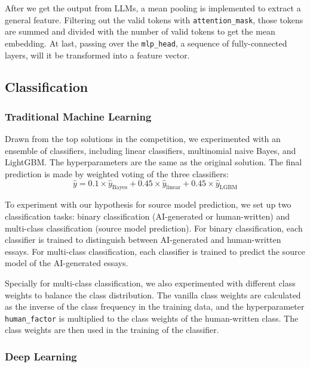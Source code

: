 \documentclass[conference]{IEEEtran}
\begin{document}
After we get the output from LLMs, a mean pooling is implemented to extract a general feature. Filtering out the valid tokens with \texttt{attention\_mask}, those tokens are summed and divided with the number of valid tokens to get the mean embedding. At last, passing over the \texttt{mlp\_head}, a sequence of fully-connected layers, will it be transformed into a feature vector.

\subsection{Classification}

\subsubsection{Traditional Machine Learning}
\label{sec:traditional_ml}

Drawn from the top solutions in the competition, we experimented with an ensemble of classifiers, including linear classifiers, multinomial naive Bayes, and LightGBM. The hyperparameters are the same as the original solution. The final prediction is made by weighted voting of the three classifiers:
\begin{equation}
  \hat{y} = 0.1 \times \hat{y}_{\text{Bayes}} + 0.45 \times \hat{y}_{\text{linear}} + 0.45 \times \hat{y}_{\text{LGBM}}
\end{equation}

To experiment with our hypothesis for source model prediction, we set up two classification tasks: binary classification (AI-generated or human-written) and multi-class classification (source model prediction). For binary classification, each classifier is trained to distinguish between AI-generated and human-written essays. For multi-class classification, each classifier is trained to predict the source model of the AI-generated essays.

Specially for multi-class classification, we also experimented with different class weights to balance the class distribution. The vanilla class weights are calculated as the inverse of the class frequency in the training data, and the hyperparameter \texttt{human\_factor} is multiplied to the class weights of the human-written class. The class weights are then used in the training of the classifier.


\subsubsection{Deep Learning}
\end{document}
